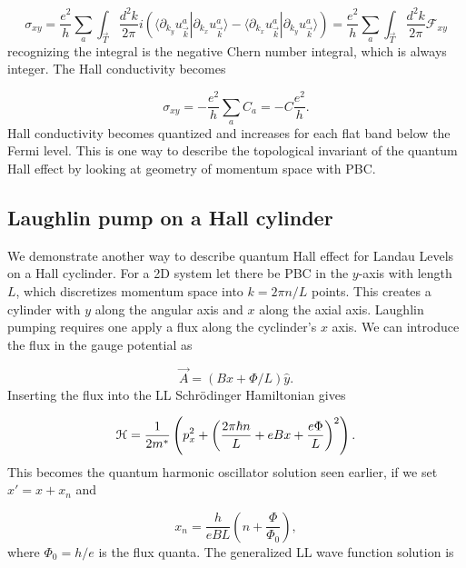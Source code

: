 \begin{equation}
  \sigma_{xy} = \dfrac{e^2}{h} \sum_{a} \int_{\vec{T}} \dfrac{d^2k}{2\pi} i\left(\langle \partial_{k_y} u_{\vec{k}}^a | \partial_{k_x} u_{\vec{k}}^a \rangle - \langle \partial_{k_x} u_{\vec{k}}^a | \partial_{k_y} u_{\vec{k}}^a \rangle \right) = \dfrac{e^2}{h} \sum_{a} \int_{\vec{T}} \dfrac{d^2k}{2\pi} \mathcal{F}_{xy}
\end{equation}
recognizing the integral is the negative Chern number integral, which is always integer.
The Hall conductivity becomes

\begin{equation}
  \sigma_{xy} = -\dfrac{e^2}{h} \sum_a C_a = -C \dfrac{e^2}{h}.
\end{equation}
Hall conductivity becomes quantized and increases for each flat band below the Fermi level.
This is one way to describe the topological invariant of the quantum Hall effect by looking at geometry of momentum space with PBC.

\subsection{Laughlin pump on a Hall cylinder}
We demonstrate another way to describe quantum Hall effect for Landau Levels on a Hall cyclinder.
For a 2D system let there be PBC in the $y$-axis with length $L$, which discretizes momentum space into $k = 2\pi n/ L$ points.
This creates a cylinder with $y$ along the angular axis and $x$ along the axial axis.
Laughlin pumping requires one apply a flux along the cyclinder's $x$ axis.
We can introduce the flux in the gauge potential as

\begin{equation}
  \vec{A} = (Bx + \Phi/L)\hat{y}.
\end{equation}
Inserting the flux into the LL Schr\"{o}dinger Hamiltonian gives

\begin{equation}
  \mathcal{H} = \dfrac{1}{2m^*} \left( p_x^2 + {\left(\dfrac{2\pi \hbar n}{L} + eBx + \dfrac{e\Phi}{L} \right)}^2\right).
\end{equation}
This becomes the quantum harmonic oscillator solution seen earlier, if we set $x' = x + x_n$ and

\begin{equation} \label{eq:xCM}
  x_n = \dfrac{h}{eBL} \left(n + \dfrac{\Phi}{\Phi_0} \right),
\end{equation}
where $\Phi_0 = h/e$ is the flux quanta.
The generalized LL wave function solution is

